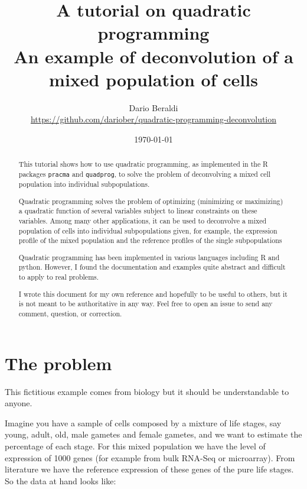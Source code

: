 \documentclass[11pt, fleqn]{article}
\title{A tutorial on quadratic programming \\
\medskip
\large An example of deconvolution of a mixed population of cells}
\author{Dario Beraldi \\
\href{https://github.com/dariober/quadratic-programming-deconvolution}{https://github.com/dariober/quadratic-programming-deconvolution}}
\date{\today}
\begin{document}
\renewcommand{\abstractname}{\vspace{-\baselineskip}}

\maketitle
\tableofcontents
\pagebreak

\begin{abstract}
\noindent
This tutorial shows how to use quadratic programming, as implemented in the R
packages \texttt{pracma} and \texttt{quadprog}, to solve the problem of
deconvolving a mixed cell population into individual subpopulations.

\noindent
Quadratic programming solves the problem of optimizing (minimizing or
maximizing) a quadratic function of several variables subject to linear
constraints on these variables.  Among many other applications, it can be
used to deconvolve a mixed population of cells into individual
subpopulations given, for example, the expression profile of the mixed
population and the reference profiles of the single subpopulations

\noindent
Quadratic programming has been implemented in various languages including R and
python. However, I found the documentation and examples quite abstract and difficult to 
apply to real problems.

\noindent
I wrote this document for my own reference and hopefully to be useful to
others, but it is not meant to be authoritative in any way. Feel free to open
an issue to send any comment, question, or correction. 
\end{abstract}

\section{The problem}

This fictitious example comes from biology but it should be understandable to
anyone. 

Imagine you have a sample of cells composed by a mixture of
life stages, say young, adult, old, male gametes and female gametes, and we want to estimate the
percentage of each stage. For this mixed population we have the level of
expression of 1000 genes (for example from bulk RNA-Seq or microarray). From literature we
have the reference expression of these genes of the pure life stages. So the data at hand looks like:
\end{document}
